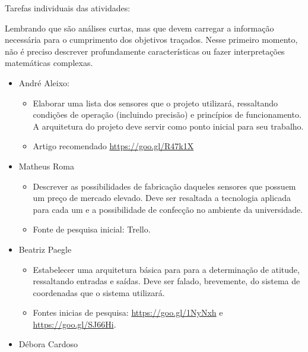\documentclass{article}
\begin{document}
\begin{doublespace}
\end{doublespace}

Tarefas individuais das atividades:

\begin{doublespace}
\end{doublespace}

Lembrando que são análises curtas, mas que devem carregar a informação necessária para o cumprimento dos objetivos traçados. Nesse primeiro momento, não é preciso descrever profundamente características ou fazer interpretações matemáticas complexas. 

\begin{doublespace}
\end{doublespace}

\begin{itemize}
    \item André Aleixo:
    \begin{itemize}
        \item Elaborar uma lista dos sensores que o projeto utilizará, ressaltando condições de operação (incluindo precisão) e princípios de funcionamento. A arquitetura do projeto deve servir como ponto inicial para seu trabalho.
        \item Artigo recomendado \url{https://goo.gl/R47k1X}
    \end{itemize}
        \item Matheus Roma
    \begin{itemize}
        \item Descrever as possibilidades de fabricação daqueles sensores  que possuem um preço de mercado elevado. Deve ser resaltada a tecnologia aplicada para cada um e a possibilidade de confecção no ambiente da universidade.
        \item Fonte de pesquisa inicial: Trello.
    \end{itemize}
    \item Beatriz Paegle
    \begin{itemize}
        \item Estabelecer uma arquitetura básica para para a determinação de atitude, ressaltando entradas e saídas. Deve ser falado, brevemente, do sistema de coordenadas que o sistema utilizará.
        \item Fontes inicias de pesquisa: \url{https://goo.gl/1NyNxh} e \url{https://goo.gl/SJ66Hi}.
    \end{itemize}
    \item Débora Cardoso

\end{itemize}
\end{document}
